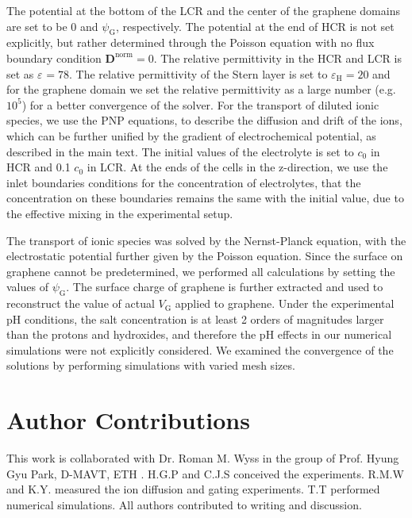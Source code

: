 The potential at the
bottom of the LCR and the center of the graphene domains are set to be
0 and $\psi_{\mathrm{G}}$, respectively. The potential at the end of
HCR is not set explicitly, but rather determined through the Poisson
equation with no flux boundary condition
$\boldsymbol{D}^{\mathrm{norm}}=0$. The relative permittivity in the
HCR and LCR is set as $\varepsilon_{\mathrm{}}=78$. The relative
permittivity of the Stern layer is set to
$\varepsilon_{\mathrm{H}}=20$\cite{Conway_1951} and for the graphene
domain we set the relative permittivity as a large number
(e.g. $10^{5}$) for a better convergence of the solver.  For the
transport of diluted ionic species, we use the PNP equations, to
describe the diffusion and drift of the ions, which can be further
unified by the gradient of electrochemical potential, as described in
the main text. The initial values of the electrolyte is set to $c_{0}$
in HCR and 0.1 $c_{0}$ in LCR. At the ends of the cells in the
z-direction, we use the inlet boundaries conditions for the
concentration of electrolytes, that the concentration on these
boundaries remains the same with the initial value, due to the
effective mixing in the experimental setup.

The
transport of ionic species was solved by the Nernst-Planck equation,
with the electrostatic potential further given by the Poisson
equation. Since the surface on graphene cannot be predetermined, we
performed all calculations by setting the values of
$\psi_{\mathrm{G}}$. The surface charge of graphene is further
extracted and used to reconstruct the value of actual $V_{\mathrm{G}}$
applied to graphene.  { Under the experimental pH conditions, the salt
  concentration is at least 2 orders of magnitudes larger than the
  protons and hydroxides, and therefore the pH effects in our
  numerical simulations were not explicitly considered.  } We examined
the convergence of the solutions by performing simulations with varied
mesh sizes. 



\section{Author Contributions}
\label{sec:np-np-author-contrib}

This work is collaborated with Dr. Roman M. Wyss in the group of
Prof. Hyung Gyu Park, D-MAVT, ETH \zurich{}.  H.G.P and C.J.S
conceived the experiments. R.M.W and K.Y. measured the ion diffusion
and gating experiments. T.T performed numerical simulations. All
authors contributed to writing and discussion.

























